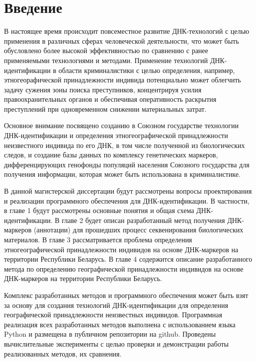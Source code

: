 \chapter*{Введение}

В настоящее время происходит повсеместное развитие ДНК-технологий с целью применения
в различных сферах человеческой деятельности, что может быть обусловлено более высокой
эффективностью по сравнению с ранее применяемыми технологиями и методами.
Применение технологий ДНК-идентификации в области криминалистики с целью определения,
например, этногеорафической принадлежности индивида потенциально может облегчить задачу сужения зоны поиска
преступников, концентрируя усилия правоохранительных органов и обеспечивая оперативность раскрытия преступлений
при одновременном снижении материальных затрат.

Основное внимание посвящено созданию в Союзном государстве технологии ДНК-идентификации и
определения этногеографической принадлежности неизвестного индивида по его ДНК,
в том числе полученной из биологических следов, и создание базы данных по комплексу генетических маркеров,
дифференцирующих генофонды популяций населения Союзного государства для получения информации, которая может быть
использована в криминалистике.

В данной магистерской диссертации будут рассмотрены вопросы проектирования и реализации
программного обеспечения для ДНК-идентификации. В частности, в главе 1 будут рассмотрены основные понятия
и общая схема ДНК-идентификации. В главе 2 будет описан разработанный метод получения ДНК-маркеров (аннотации)
для прошедших процесс секвенирования биологических материалов. В главе 3 рассматривается проблема определения
этногеографической принадлежности индивидов на основе ДНК-маркеров на территории Республики Беларусь.
В главе 4 содержится описание разработанного метода по определению географической принадлежности
индивидов на основе ДНК-маркеров на территории Республики Беларусь.

Комплекс разработанных методов и программного обеспечения может быть взят за основу для создания
технологий ДНК-идентификации для определения географической принадлежности неизвестных индивидов.
Программная реализация всех разработанных методов выполнена с использованием языка Python
и размещена в публичном репозитории на github. Проведены вычислительные эксперименты с целью
проверки и демонстрации работы реализованных методов, их сравнения.
